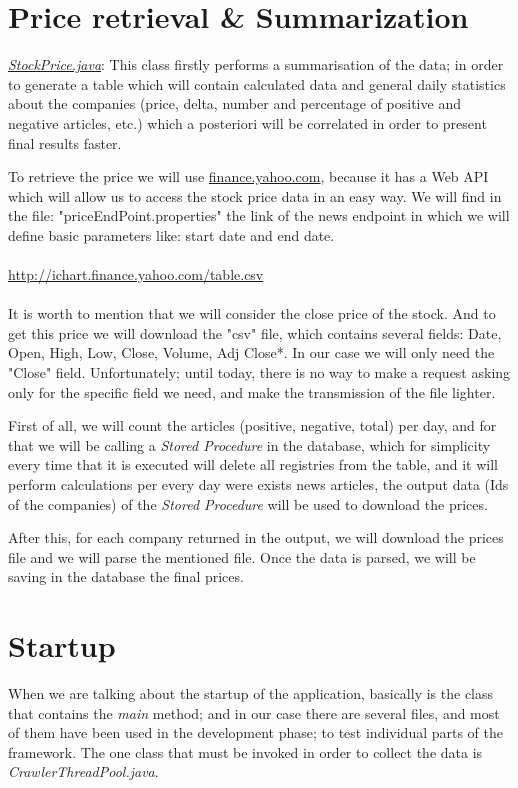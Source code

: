\section{Price retrieval \& Summarization}\label{priceRetrieval}

\emph{\ul{StockPrice.java}}: This class firstly performs a summarisation of the data; in order to generate a table which will contain calculated data and general daily statistics about the companies (price, delta, number and percentage of positive and negative articles, etc.) which a posteriori will be correlated in order to present final results faster.

To retrieve the price we will use \url{finance.yahoo.com}, because it has a Web API which will allow us to access the stock price data in an easy way. We will find in the file: "priceEndPoint.properties" the link of the news endpoint in which we will define basic parameters like: start date and end date.
\\\\
\url{http://ichart.finance.yahoo.com/table.csv} 
\\\\
It is worth to mention that we will consider the close price of the stock. And to get this price we will download the "csv" file, which contains several fields: Date, Open, High, Low, Close, Volume, Adj Close*. In our case we will only need the "Close" field. Unfortunately; until today, there is no way to make a request asking only for the specific field we need, and make the transmission of the file lighter.

First of all, we will count the articles (positive, negative, total) per day, and for that we will be calling a \emph{Stored Procedure} in the database, which for simplicity every time that it is executed will delete all registries from the table, and it will perform calculations per every day were exists news articles, the output data (Ids of the companies) of the \emph{Stored Procedure} will be used to download the prices. 

After this, for each company returned in the output, we will download the prices file and we will parse the mentioned file. Once the data is parsed, we will be saving in the database the final prices.

\section{Startup}

When we are talking about the startup of the application, basically is the class that contains the \emph{main} method; and in our case there are several files, and most of them have been used in the development phase; to test individual parts of the framework. The one class that must be invoked in order to collect the data is \emph{CrawlerThreadPool.java}.

